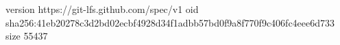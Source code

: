 version https://git-lfs.github.com/spec/v1
oid sha256:41eb20278c3d2bd02ecbf4928d34f1adbb57bd0f9a8f770f9c406fc4eee6d733
size 55437

